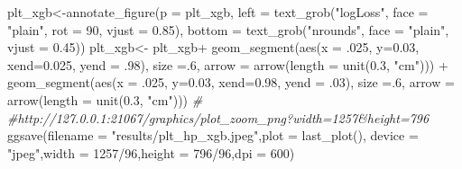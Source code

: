 \documentclass[
]{article}
\newenvironment{Shaded}{\begin{snugshade}}{\end{snugshade}}
\newcommand{\AttributeTok}[1]{\textcolor[rgb]{0.77,0.63,0.00}{#1}}
\newcommand{\CommentTok}[1]{\textcolor[rgb]{0.56,0.35,0.01}{\textit{#1}}}
\newcommand{\DecValTok}[1]{\textcolor[rgb]{0.00,0.00,0.81}{#1}}
\newcommand{\FloatTok}[1]{\textcolor[rgb]{0.00,0.00,0.81}{#1}}
\newcommand{\FunctionTok}[1]{\textcolor[rgb]{0.00,0.00,0.00}{#1}}
\newcommand{\NormalTok}[1]{#1}
\newcommand{\OtherTok}[1]{\textcolor[rgb]{0.56,0.35,0.01}{#1}}
\newcommand{\SpecialCharTok}[1]{\textcolor[rgb]{0.00,0.00,0.00}{#1}}
\newcommand{\StringTok}[1]{\textcolor[rgb]{0.31,0.60,0.02}{#1}}
\begin{document}
\begin{Shaded}
\begin{Highlighting}[]
\NormalTok{plt\_xgb}\OtherTok{\textless{}{-}}\FunctionTok{annotate\_figure}\NormalTok{(}\AttributeTok{p =}\NormalTok{ plt\_xgb,}
                            \AttributeTok{left =} \FunctionTok{text\_grob}\NormalTok{(}\StringTok{"logLoss"}\NormalTok{, }\AttributeTok{face =} \StringTok{"plain"}\NormalTok{,}
                                             \AttributeTok{rot =} \DecValTok{90}\NormalTok{, }\AttributeTok{vjust =} \FloatTok{0.85}\NormalTok{),}
                            \AttributeTok{bottom =} \FunctionTok{text\_grob}\NormalTok{(}\StringTok{"nrounds"}\NormalTok{,}
                                               \AttributeTok{face =} \StringTok{"plain"}\NormalTok{, }\AttributeTok{vjust =} \FloatTok{0.45}\NormalTok{))}
\NormalTok{plt\_xgb}\OtherTok{\textless{}{-}}\NormalTok{ plt\_xgb}\SpecialCharTok{+}
  \FunctionTok{geom\_segment}\NormalTok{(}\FunctionTok{aes}\NormalTok{(}\AttributeTok{x =}\NormalTok{ .}\DecValTok{025}\NormalTok{, }\AttributeTok{y=}\FloatTok{0.03}\NormalTok{, }\AttributeTok{xend=}\FloatTok{0.025}\NormalTok{, }\AttributeTok{yend =}\NormalTok{ .}\DecValTok{98}\NormalTok{), }\AttributeTok{size =}\NormalTok{.}\DecValTok{6}\NormalTok{,}
               \AttributeTok{arrow =} \FunctionTok{arrow}\NormalTok{(}\AttributeTok{length =} \FunctionTok{unit}\NormalTok{(}\FloatTok{0.3}\NormalTok{, }\StringTok{"cm"}\NormalTok{))) }\SpecialCharTok{+}
  \FunctionTok{geom\_segment}\NormalTok{(}\FunctionTok{aes}\NormalTok{(}\AttributeTok{x =}\NormalTok{ .}\DecValTok{025}\NormalTok{, }\AttributeTok{y=}\FloatTok{0.03}\NormalTok{, }\AttributeTok{xend=}\FloatTok{0.98}\NormalTok{, }\AttributeTok{yend =}\NormalTok{ .}\DecValTok{03}\NormalTok{), }\AttributeTok{size =}\NormalTok{.}\DecValTok{6}\NormalTok{,}
               \AttributeTok{arrow =} \FunctionTok{arrow}\NormalTok{(}\AttributeTok{length =} \FunctionTok{unit}\NormalTok{(}\FloatTok{0.3}\NormalTok{, }\StringTok{"cm"}\NormalTok{)))}
\CommentTok{\# \#http://127.0.0.1:21067/graphics/plot\_zoom\_png?width=1257\&height=796}
\FunctionTok{ggsave}\NormalTok{(}\AttributeTok{filename =} \StringTok{"results/plt\_hp\_xgb.jpeg"}\NormalTok{,}\AttributeTok{plot =} \FunctionTok{last\_plot}\NormalTok{(),}
       \AttributeTok{device =} \StringTok{"jpeg"}\NormalTok{,}\AttributeTok{width =} \DecValTok{1257}\SpecialCharTok{/}\DecValTok{96}\NormalTok{,}\AttributeTok{height =} \DecValTok{796}\SpecialCharTok{/}\DecValTok{96}\NormalTok{,}\AttributeTok{dpi =} \DecValTok{600}\NormalTok{)}
\end{Highlighting}
\end{Shaded}
\end{document}
